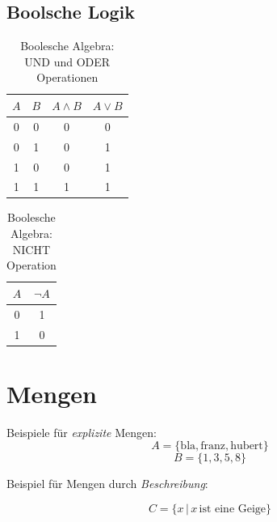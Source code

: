 
\subsection{Boolsche Logik}
\label{sec:bool}

\begin{table}[h!]
    \centering
    \begin{tabular}{|c|c|c|c|}
        \hline
        $A$ & $B$ & $A \land B$ & $A \lor B$ \\
        \hline
        0 & 0 & 0 & 0 \\
        0 & 1 & 0 & 1 \\
        1 & 0 & 0 & 1 \\
        1 & 1 & 1 & 1 \\
        \hline
    \end{tabular}
    \caption{Boolesche Algebra: UND und ODER Operationen}
\end{table}

\begin{table}[h!]
    \centering
    \begin{tabular}{|c|c|}
        \hline
        $A$ & $\neg A$ \\
        \hline
        0 & 1 \\
        1 & 0 \\
        \hline
    \end{tabular}
    \caption{Boolesche Algebra: NICHT Operation}
\end{table}


\section{Mengen}


Beispiele für \emph{explizite} Mengen:
$$ A = \{ \text{bla}, \text{franz}, \text{hubert} \} $$ 
$$ B = \{ 1, 3, 5, 8 \} $$ 

Beispiel für Mengen durch \emph{Beschreibung}:

$$ C = \{x \, | \, x \, \text{ist eine Geige} \} $$

